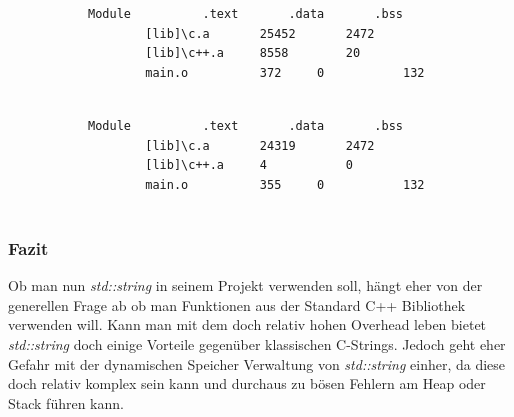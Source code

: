 \documentclass[MES,Master,ngerman]{twbook}%
\begin{document}
\begin{figure}[!htb]
	\begin{subfigure}[b]{0.5\textwidth}
		\begin{lstlisting}[gobble=6, title={std::string}, language=bash, numbers=none]
		Module 			.text		.data		.bss
		[lib]\c.a		25452		2472		11
		[lib]\c++.a		8558		20			204
		main.o			372		0			132
		
		\end{lstlisting}
	\end{subfigure}
	\begin{subfigure}[b]{0.5\textwidth}
		\begin{lstlisting}[gobble=6, title={C- Strings}, language=bash, numbers=none]
		Module 			.text		.data		.bss
		[lib]\c.a		24319		2472		89
		[lib]\c++.a		4			0			0
		main.o			355		0			132
		
		\end{lstlisting}
	\end{subfigure}
\end{figure}
\newpage
\subsubsection{Fazit}
Ob man nun \textit{std::string} in seinem Projekt verwenden soll, hängt eher von der generellen Frage ab ob man Funktionen aus der Standard C++ Bibliothek verwenden will. Kann man mit dem doch relativ hohen Overhead leben bietet \textit{std::string} doch einige Vorteile gegenüber klassischen C-Strings. Jedoch geht eher Gefahr mit der dynamischen Speicher Verwaltung von \textit{std::string} einher, da diese doch relativ komplex sein kann und durchaus zu bösen Fehlern am Heap oder Stack führen kann.


\newpage
\end{document}
